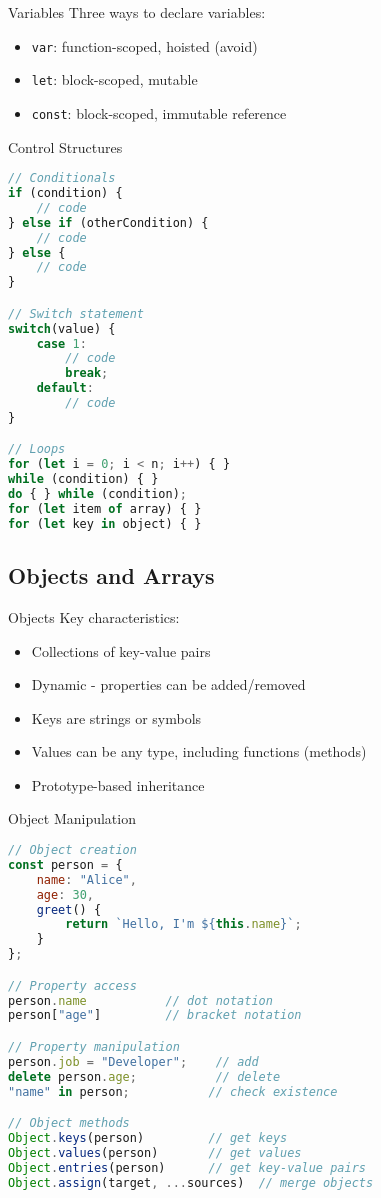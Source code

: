 \begin{definition}{Variables}
    Three ways to declare variables:
    \begin{itemize}
        \item \texttt{var}: function-scoped, hoisted (avoid)
        \item \texttt{let}: block-scoped, mutable
        \item \texttt{const}: block-scoped, immutable reference
    \end{itemize}
\end{definition}

\begin{KR}{Control Structures}
\begin{lstlisting}[language=JavaScript, style=basesmol]
// Conditionals
if (condition) {
    // code
} else if (otherCondition) {
    // code
} else {
    // code
}

// Switch statement
switch(value) {
    case 1:
        // code
        break;
    default:
        // code
}

// Loops
for (let i = 0; i < n; i++) { }
while (condition) { }
do { } while (condition);
for (let item of array) { }
for (let key in object) { }
\end{lstlisting}
\end{KR}

\subsection{Objects and Arrays}

\begin{concept}{Objects}
    Key characteristics:
    \begin{itemize}
        \item Collections of key-value pairs
        \item Dynamic - properties can be added/removed
        \item Keys are strings or symbols
        \item Values can be any type, including functions (methods)
        \item Prototype-based inheritance
    \end{itemize}
\end{concept}

\begin{KR}{Object Manipulation}
\begin{lstlisting}[language=JavaScript, style=basesmol]
// Object creation
const person = {
    name: "Alice",
    age: 30,
    greet() {
        return `Hello, I'm ${this.name}`;
    }
};

// Property access
person.name           // dot notation
person["age"]         // bracket notation

// Property manipulation
person.job = "Developer";    // add
delete person.age;           // delete
"name" in person;           // check existence

// Object methods
Object.keys(person)         // get keys
Object.values(person)       // get values
Object.entries(person)      // get key-value pairs
Object.assign(target, ...sources)  // merge objects
\end{lstlisting}
\end{KR}

